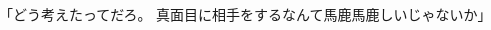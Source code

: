 \documentclass[chapter3.tex]{subfiles}
\begin{document}
\begin{CJK}{UTF8}{ipxm}
    「どう考えたってだろ。
    真面目に相手をするなんて馬鹿馬鹿しいじゃないか」

\end{CJK}
\end{document}
